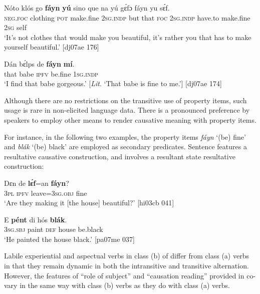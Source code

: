 \ea%
    \label{ex:key:1121}
    \gll Nóto  klós    go \textbf{fáyn}  \textbf{yú} sino    que
na  yú    gɛ́fɔ    fáyn    yu  sɛ́f.\\
\textsc{neg}.\textsc{foc}  clothing  \textsc{pot}  make.fine  \textsc{2sg.indp}  but    that  
\textsc{foc}  \textsc{2sg.indp}  have.to  make.fine  \textsc{2sg}  self\\

\glt ‘It’s not clothes that would make you beautiful, it’s rather you 
that has to make yourself beautiful.’ [dj07ae 176]
\z


\ea%
    \label{ex:key:1122}
    \gll Dán  bɛ́lps  de  \textbf{fáyn}  \textbf{mí}.\\
that  babe  \textsc{ipfv}  be.fine  \textsc{1sg.indp}\\

\glt ‘I find that babe gorgeous.’ [\textit{Lit}. ‘That babe is fine to me.’] [dj07ae 174]
\z

Although there are no restrictions on the transitive use of property items, such usage is rare in non-elicited language data. There is a pronounced preference by speakers to employ other means to render causative meaning with property items. 


For instance, in the following two examples, the property items \textit{fáyn} ‘(be) fine’ and \textit{blák} ‘(be) black’ are employed as secondary predicates. Sentence  features a resultative causative construction, and  involves a resultant state resultative construction: 



\ea%
    \label{ex:key:1123}
    \gll Dɛn  de  \textbf{lɛ́f}=an    \textbf{fáyn}?\\
\textsc{3pl}  \textsc{ipfv}  leave=\textsc{3sg.obj}  fine\\

\glt ‘Are they making it [the house] beautiful?’ [hi03cb 041]
\z


\ea%
    \label{ex:key:1124}
    \gll E    \textbf{pént}  di  hós    \textbf{blák}.\\
\textsc{3sg.sbj}  paint  \textsc{def}  house  be.black\\

\glt ‘He painted the house black.’ [pa07me 037]
\z

Labile experiential and aspectual verbs in class (b) of  differ from class (a) verbs in that they remain dynamic in both the intransitive and transitive alternation. However, the features of “role of subject” and “causation reading” provided in  co-vary in the same way with class (b) verbs as they do with class (a) verbs.



